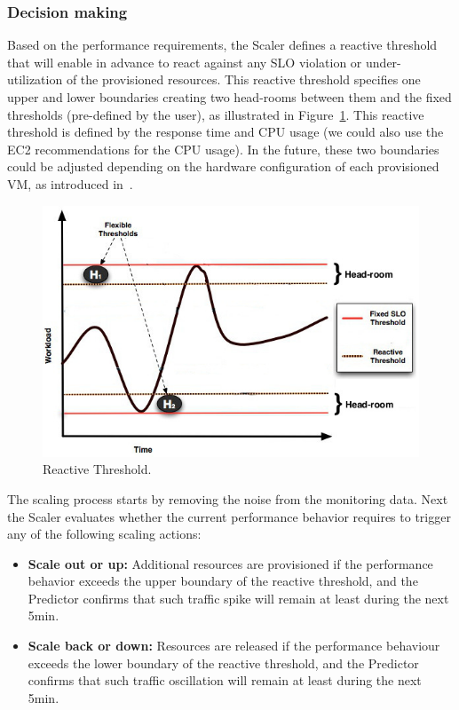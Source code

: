 \subsubsection{Decision making}

Based on the performance requirements, the Scaler defines a reactive threshold that will enable  in advance to react against any SLO violation or under-utilization of the provisioned resources. This reactive threshold specifies one upper and lower boundaries creating two head-rooms between them and the fixed thresholds (pre-defined by the user), as illustrated in Figure~\ref{threshold}. This reactive threshold is defined by the response time and CPU usage (we could also use the EC2 recommendations for the CPU usage). In the future, these two boundaries could be adjusted depending on the hardware configuration of each provisioned VM, as introduced in~\cite{beloglazov_adaptive_2010}.  

\begin{figure}[htb]
  \begin{center}
    \includegraphics[width=.85\linewidth]{images/thresholdGraphic.jpg}
  \end{center}
\vspace{-5mm}
  \caption{Reactive Threshold.}
  \label{threshold}
\end{figure}

The scaling process starts by removing the noise from the monitoring data. Next the Scaler evaluates whether the current performance behavior requires to trigger any of the following scaling actions:

\begin{itemize}

\item \textbf{Scale out or up:} Additional resources are provisioned if the performance behavior exceeds the upper boundary of the reactive threshold, and the Predictor confirms that such traffic spike will remain at least during the next 5min. 

\item \textbf{Scale back or down:} Resources are released if the performance behaviour exceeds the lower boundary of the reactive threshold, and the Predictor confirms that such traffic oscillation will remain at least during the next 5min.

\end{itemize}

